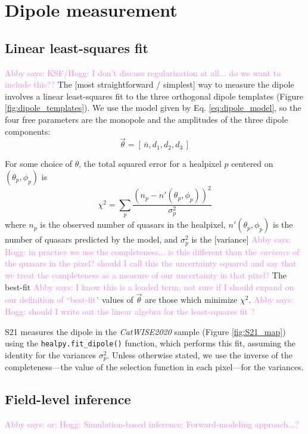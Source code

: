 \documentclass[modern]{aastex631}
\newcommand{\abby}[1]{\textcolor{violet}{Abby says: #1}}
\newcommand{\catwisetwentytwenty}{\textsl{CatWISE2020}\xspace}
\begin{document}
\section{Dipole measurement}
\label{sec:dipole_measurement}

\subsection{Linear least-squares fit}
\label{sec:standard_dipole}

\abby{KSF/Hogg: I don't discuss regularization at all... do we want to include this??}
The [most straightforward / simplest] way to measure the dipole involves a linear least-squares fit to the three orthogonal dipole templates (Figure \ref{fig:dipole_templates}).
We use the model given by Eq. \ref{eq:dipole_model}, so the four free parameters are the monopole and the amplitudes of the three dipole components:
\begin{equation}
    \vec{\theta} = [\,\bar n, d_1, d_2, d_3\,]
\end{equation}

For some choice of $\theta$, the total squared error for a healpixel $p$ centered on $(\theta_p,\phi_p)$ is
\begin{equation}
\label{eq:chisq}
    \chi^2 = \sum_p \frac{\left(n_p - n'(\theta_p,\phi_p)\right)^2}{\sigma_p^2}
\end{equation}
where $n_p$ is the observed number of quasars in the healpixel, $n'(\theta_p,\phi_p)$ is the number of quasars predicted by the model, and $\sigma_p^2$ is the [variance] \abby{Hogg: in practice we use the completeness... is this different than the \textit{variance} of the quasars in the pixel? should I call this the uncertainty squared and say that we treat the completeness as a measure of our uncertainty in that pixel?}
The best-fit \abby{I know this is a loaded term, not sure if I should expand on our definition of ``best-fit"} values of $\vec\theta$ are those which minimize $\chi^2$.
\abby{Hogg: should I write out the linear algebra for the least-squares fit ?}

S21 measures the dipole in the \catwisetwentytwenty sample (Figure \ref{fig:S21_map}) using the \texttt{healpy.fit\_dipole()} function, which performs this fit, assuming the identity for the variances $\sigma_p^2$.
Unless otherwise stated, we use the inverse of the completeness—the value of the selection function in each pixel—for the variances.


\subsection{Field-level inference}
\label{sec:FLI}
\abby{or: Hogg: Simulation-based inference; Forward-modeling approach...?}
\end{document}
